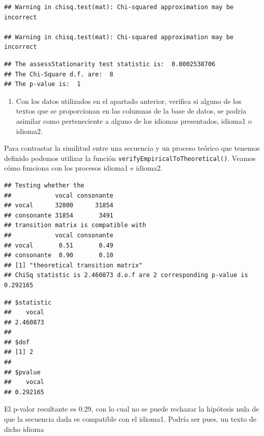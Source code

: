 \documentclass[
]{book}
\newenvironment{Shaded}{\begin{snugshade}}{\end{snugshade}}
\newcommand{\CommentTok}[1]{\textcolor[rgb]{0.56,0.35,0.01}{\textit{#1}}}
\newcommand{\FunctionTok}[1]{\textcolor[rgb]{0.00,0.00,0.00}{#1}}
\newcommand{\NormalTok}[1]{#1}
\newcommand{\SpecialCharTok}[1]{\textcolor[rgb]{0.00,0.00,0.00}{#1}}
\providecommand{\tightlist}{%
  \setlength{\itemsep}{0pt}\setlength{\parskip}{0pt}}
\theoremstyle{definition}
\theoremstyle{definition}
\theoremstyle{definition}
\theoremstyle{definition}
\theoremstyle{remark}
\begin{document}
\begin{verbatim}
## Warning in chisq.test(mat): Chi-squared approximation may be incorrect

## Warning in chisq.test(mat): Chi-squared approximation may be incorrect
\end{verbatim}

\begin{verbatim}
## The assessStationarity test statistic is:  0.0002538706 
## The Chi-Square d.f. are:  8 
## The p-value is:  1
\end{verbatim}

\begin{enumerate}
\def\labelenumi{\arabic{enumi}.}
\setcounter{enumi}{9}
\tightlist
\item
  Con los datos utilizados en el apartado anterior, verifica si alguno de los textos que se proporcionan en las columnas de la base de datos, se podría asimilar como perteneciente a alguno de los idiomas presentados, idioma1 o idioma2.
\end{enumerate}

Para contrastar la similitud entre una secuencia y un proceso teórico que tenemos definido podemos utilizar la función \texttt{verifyEmpiricalToTheoretical()}. Veamos cómo funciona con los procesos idioma1 e idioma2.

\begin{Shaded}
\end{Shaded}

\begin{verbatim}
## Testing whether the
##            vocal consonante
## vocal      32800      31854
## consonante 31854       3491
## transition matrix is compatible with
##            vocal consonante
## vocal       0.51       0.49
## consonante  0.90       0.10
## [1] "theoretical transition matrix"
## ChiSq statistic is 2.460873 d.o.f are 2 corresponding p-value is 0.292165
\end{verbatim}

\begin{verbatim}
## $statistic
##    vocal 
## 2.460873 
## 
## $dof
## [1] 2
## 
## $pvalue
##    vocal 
## 0.292165
\end{verbatim}

El p-valor resultante es 0.29, con lo cual no se puede rechazar la hipótesis nula de que la secuencia dada es compatible con el idioma1. Podría ser pues, un texto de dicho idioma
\end{document}
